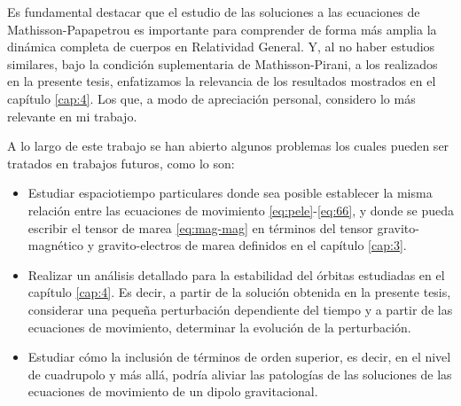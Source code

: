 Es fundamental destacar que el estudio de las soluciones a las ecuaciones de Mathisson-Papapetrou es importante para comprender de forma más amplia la dinámica completa de cuerpos en Relatividad General. Y, al no haber estudios similares, bajo la condición suplementaria de Mathisson-Pirani, a los realizados en la presente tesis, enfatizamos la relevancia de los resultados mostrados en el capítulo \ref{cap:4}. Los que, a modo de apreciación personal, considero lo más relevante en mi trabajo.

A lo largo de este trabajo se han abierto algunos problemas los cuales pueden ser tratados en trabajos futuros, como lo son:
\begin{itemize}
\item Estudiar espaciotiempo particulares donde sea posible establecer la misma relación entre las ecuaciones de movimiento \eqref{eq:pele}-\eqref{eq:66}, y donde se pueda escribir el tensor de marea \eqref{eq:mag-mag} en términos del tensor gravito-magnético y gravito-electros de marea definidos en el capítulo \ref{cap:3}.
\item Realizar un análisis detallado para la estabilidad del órbitas estudiadas en el capítulo \ref{cap:4}. Es decir, a partir de la solución obtenida en la presente tesis, considerar una pequeña perturbación dependiente del tiempo y a partir de las ecuaciones de movimiento, determinar la evolución de la perturbación.
\item Estudiar cómo la inclusión de términos de orden superior, es decir, en el nivel de cuadrupolo y más allá, podría aliviar las patologías de las soluciones de las ecuaciones de movimiento de un dipolo gravitacional.
\end{itemize}